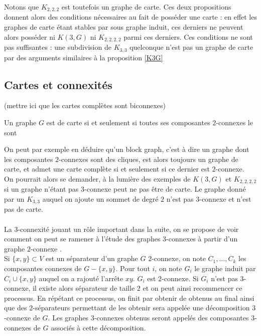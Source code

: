 \documentclass{scrartcl}
\begin{document}
\begin{flushleft}
Notons que $K_{2,2,2}$ est toutefois un graphe de carte. Ces deux propositions donnent alors des conditions nécessaires au fait
de posséder une carte : en effet les graphes de carte étant stables par sous graphe induit, ces derniers ne peuvent alors
posséder ni $K(3, G)$ ni $K_{2,2,2,2}$ parmi ces derniers. Ces conditions ne sont pas suffisantes : une subdivision
de $K_{3,3}$ quelconque n'est pas un graphe de carte par des arguments similaires à la proposition \ref{K3G}

\subsection{Cartes et connexités}

(mettre ici que les cartes complètes sont biconnexes)

\begin{prop}\label{suffbiconn}
    Un graphe $G$ est de carte si et seulement si toutes ses composantes $2$-connexes le sont
\end{prop}

On peut par exemple en déduire qu'un block graph, c'est à dire un graphe dont les composantes $2$-connexes sont des cliques,
est alors toujours un graphe de carte, et admet une carte complète si et seulement si ce dernier est $2$-connexe.\\
On pourrait alors se demander, à la lumière des exemples de $K(3,G)$ et $K_{2,2,2,2}$ si un graphe n'étant pas $3$-connexe
peut ne pas être de carte. Le graphe donné par un $K_{3,3}$ auquel on ajoute un sommet de degré $2$ n'est pas $3$-connexe
et n'est pas de carte.
\\~\\
La $3$-connexité jouant un rôle important dans la suite, on se propose de voir comment on peut se ramener à l'étude des
graphes $3$-connexes à partir d'un graphe $2$-connexe \cite{3connComp}.\\
Si $\{x,y\} \subset V$ est un séparateur d'un graphe $G$ $2$-connexe, on note $C_1, ..., C_k$ les composantes connexes de
$G - \{x,y\}$. Pour tout $i$, on note $G_i$ le graphe induit par $C_i \cup \{x,y\}$ auquel on a rajouté l'arrête $xy$.
$G_i$ est $2$-connexe. Si $G_i$ n'est pas $3$-connexe, il existe alors séparateur de taille $2$ et on peut ainsi recommencer
ce processus. En répétant ce processus, on finit par obtenir de  obtenus au final ainsi que des $2$-séparateurs permettant de
les obtenir sera appelée une décomposition $3$-connexe de $G$. Les graphes $3$-connexes obtenus seront appelés des composantes
$3$-connexes de $G$ associés à cette décomposition.


\end{flushleft}
\end{document}
